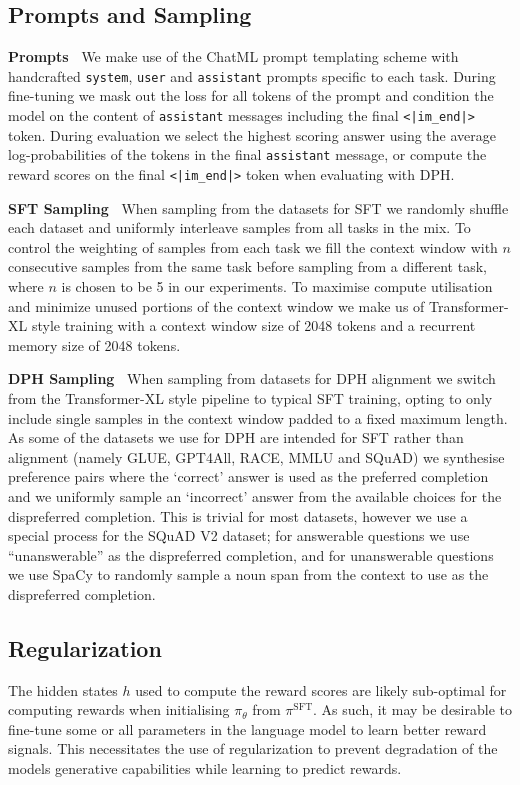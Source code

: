 \subsection{Prompts and Sampling}
\textbf{Prompts\ } We make use of the ChatML prompt templating scheme \cite{chatml} with handcrafted \texttt{system}, \texttt{user} and \texttt{assistant} prompts specific to each task. During fine-tuning we mask out the loss for all tokens of the prompt and condition the model on the content of \texttt{assistant} messages including the final \texttt{<|im\_end|>} token. During evaluation we select the highest scoring answer using the average log-probabilities of the tokens in the final \texttt{assistant} message, or compute the reward scores on the final \texttt{<|im\_end|>} token when evaluating with DPH.

\textbf{SFT Sampling\ } \label{sec:sft-sampling} When sampling from the datasets for SFT we randomly shuffle each dataset and uniformly interleave samples from all tasks in the mix. To control the weighting of samples from each task we fill the context window with $n$ consecutive samples from the same task before sampling from a different task, where $n$ is chosen to be 5 in our experiments. To maximise compute utilisation and minimize unused portions of the context window we make us of Transformer-XL \cite{dai2019transformerxl} style training with a context window size of 2048 tokens and a recurrent memory size of 2048 tokens.

\textbf{DPH Sampling\ } \label{sec:dph-sampling} When sampling from datasets for DPH alignment we switch from the Transformer-XL style pipeline to typical SFT training, opting to only include single samples in the context window padded to a fixed maximum length. As some of the datasets we use for DPH are intended for SFT rather than alignment (namely GLUE, GPT4All, RACE, MMLU and SQuAD) we synthesise preference pairs where the `correct' answer is used as the preferred completion and we uniformly sample an `incorrect' answer from the available choices for the dispreferred completion. This is trivial for most datasets, however we use a special process for the SQuAD V2 dataset; for answerable questions we use ``unanswerable'' as the dispreferred completion, and for unanswerable questions we use SpaCy to randomly sample a noun span from the context to use as the dispreferred completion.

\subsection{Regularization} \label{sec:regularization}
The hidden states $h$ used to compute the reward scores are likely sub-optimal for computing rewards when initialising $\pi_\theta$ from $\pi^{\text{SFT}}$. As such, it may be desirable to fine-tune some or all parameters in the language model to learn better reward signals. This necessitates the use of regularization to prevent degradation of the models generative capabilities while learning to predict rewards.

